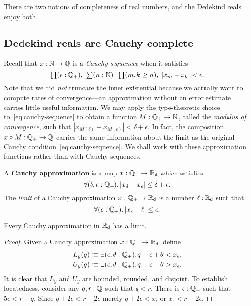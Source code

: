There are two notions of completeness of real numbers, and the Dedekind reals enjoy both.


\subsection{Dedekind reals are Cauchy complete}
\label{sec:RD-cauchy-complete}

Recall that $x : \mathbb{N} \to \mathbb{Q}$ is a \emph{Cauchy sequenece} when it satisfies
%
\begin{equation} \label{eq:cauchy-sequence}
  \prd{\epsilon : \Qp} \sm{n : \N} \prd{m, k \geq n} |x_m - x_k| < \epsilon.
\end{equation}
%
Note that we did \emph{not} truncate the inner existential because we actually want to
compute rates of convergence---an approximation without an error estimate carries little
useful information. We may apply the type-theoretic choice to~\eqref{eq:cauchy-sequence}
to obtain a function $M : \mathbb{Q}_{+} \to \mathbb{N}$, called the \emph{modulus of convergence}, such that
$|x_{M(\delta)} - x_{M(\epsilon)}|< \delta + \epsilon$. In fact, the composition $x \circ
M : \mathbb{Q}_{+} \to \mathbb{Q}$ carries the same information about the limit as the original Cauchy
condition~\eqref{eq:cauchy-sequence}. We shall work with these approximation functions
rather than with Cauchy sequences.

\begin{defn}\label{defn:cauchy-approximation}
  A \textbf{Cauchy approximation} is a map $x : \mathbb{Q}_{+} \to \mathbb{R}_\mathsf{d}$ which satisfies
  \begin{equation}
    \label{eq:cauchy-approx}
    \fall{\delta, \epsilon :\Qp} |x_\delta - x_\epsilon| \leq \delta + \epsilon.
  \end{equation}
  The \emph{limit} of a Cauchy approximation $x : \mathbb{Q}_{+} \to \mathbb{R}_\mathsf{d}$ is a number $\ell : \mathbb{R}_\mathsf{d}$ such
  that
  \begin{equation*}
    \fall{\epsilon : \Qp} |x_\epsilon - \ell| \leq \epsilon.
  \end{equation*}
\end{defn}

\begin{thm} \label{RD-cauchy-complete}
  Every Cauchy approximation in $\mathbb{R}_\mathsf{d}$ has a limit.
\end{thm}

\begin{proof}
  Given a Cauchy approximation $x : \mathbb{Q}_{+} \to \mathbb{R}_\mathsf{d}$, define
  \begin{align*}
    L_y(q) &\defeq \exis{\epsilon, \theta : \Qp} q + \epsilon + \theta < x_\epsilon,\\
    U_y(q) &\defeq \exis{\epsilon, \theta : \Qp} q - \epsilon - \theta > x_\epsilon.
  \end{align*}
  It is clear that $L_y$ and $U_y$ are bounded, rounded, and disjoint. To establish
  locatedness, consider any $q, r : \mathbb{Q}$ such that $q < r$. There is $\epsilon : \mathbb{Q}_{+}$ such
  that $5 \epsilon < r - q$. Since $q + 2 \epsilon < r - 2 \epsilon$ merely $q + 2
  \epsilon < x_\epsilon$ or $x_\epsilon < r - 2 \epsilon$.

\end{proof}


